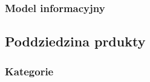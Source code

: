 \subsubsection{Model informacyjny}\label{subsubsec:database:gateway:domainModel}


\subsection{Poddziedzina prdukty}\label{subsec:database:products}

\subsubsection{Kategorie}\label{subsubsec:database:products:categories}
